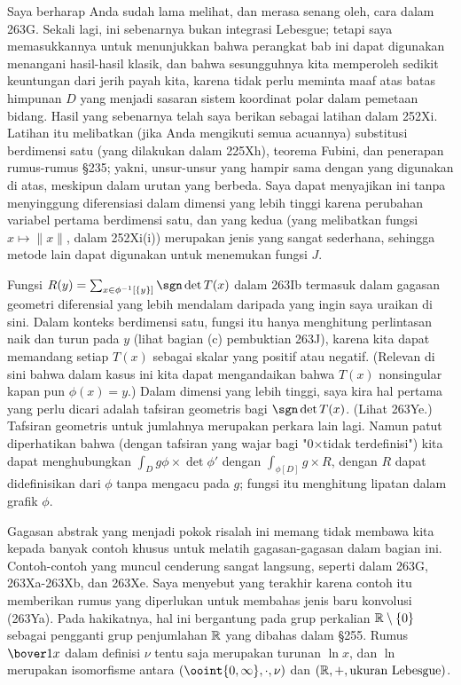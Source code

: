{Saya berharap Anda sudah lama melihat, dan merasa senang oleh, cara dalam 263G.
Sekali lagi, ini sebenarnya bukan integrasi Lebesgue;  tetapi saya memasukkannya
untuk menunjukkan bahwa perangkat bab ini dapat digunakan menangani
hasil-hasil klasik, dan bahwa sesungguhnya kita memperoleh sedikit keuntungan
dari jerih payah kita, karena tidak perlu meminta maaf atas batas himpunan
$D$ yang menjadi sasaran sistem koordinat polar dalam pemetaan bidang.
Hasil yang sebenarnya telah saya berikan sebagai latihan dalam 252Xi.
Latihan itu melibatkan (jika Anda mengikuti semua acuannya) substitusi
berdimensi satu (yang dilakukan dalam 225Xh), teorema Fubini, dan penerapan
rumus-rumus \S235;  yakni, unsur-unsur yang hampir sama dengan yang digunakan
di atas, meskipun dalam urutan yang berbeda.   Saya dapat menyajikan ini tanpa
menyinggung diferensiasi dalam dimensi yang lebih tinggi karena perubahan
variabel pertama berdimensi satu, dan yang kedua (yang melibatkan fungsi
$x\mapsto\|x\|$, dalam 252Xi(i)) merupakan jenis yang sangat sederhana, sehingga
metode lain dapat digunakan untuk menemukan fungsi $J$.

Fungsi $R(y)=\sum_{x\in\phi^{-1}[\{y\}]}\sgn\det T(x)$ dalam 263Ib
termasuk dalam gagasan geometri diferensial yang lebih mendalam daripada
yang ingin saya uraikan di sini.   Dalam konteks berdimensi satu, fungsi itu
hanya menghitung perlintasan naik dan turun pada $y$ (lihat bagian (c)
pembuktian 263J), karena kita dapat memandang setiap $T(x)$ sebagai skalar
yang positif atau negatif.   (Relevan di sini bahwa dalam kasus ini kita dapat
mengandaikan bahwa $T(x)$ nonsingular kapan pun $\phi(x)=y$.)
Dalam dimensi yang lebih tinggi, saya kira hal pertama yang perlu dicari adalah
tafsiran geometris bagi $\sgn\det T(x)$.   (Lihat 263Ye.)
Tafsiran geometris untuk jumlahnya merupakan perkara lain lagi.
Namun patut diperhatikan bahwa (dengan tafsiran yang wajar bagi
"0$\times$tidak terdefinisi") kita dapat
menghubungkan $\int_Dg\phi\times\det\phi'$ dengan $\int_{\phi[D]}g\times R$,
dengan $R$ dapat didefinisikan dari $\phi$ tanpa mengacu pada $g$;  fungsi itu
menghitung lipatan dalam grafik $\phi$.

Gagasan abstrak yang menjadi pokok risalah ini memang
tidak membawa kita kepada banyak contoh khusus untuk melatih gagasan-gagasan
dalam bagian ini.   Contoh-contoh yang muncul cenderung sangat langsung,
seperti dalam 263G, 263Xa-263Xb, dan 263Xe.   Saya menyebut yang terakhir
karena contoh itu memberikan rumus yang diperlukan untuk membahas jenis baru
konvolusi (263Ya).   Pada hakikatnya, hal ini bergantung pada grup perkalian
$\Bbb R\setminus\{0\}$ sebagai pengganti grup penjumlahan $\Bbb R$ yang dibahas
dalam \S255.   Rumus $\bover1x$ dalam definisi $\nu$ tentu saja merupakan
turunan $\ln x$, dan $\ln$ merupakan isomorfisme antara
$(\ooint{0,\infty},\cdot,\nu)$ dan $(\Bbb R,+,\text{ukuran Lebesgue})$.
}%

\discrpage
